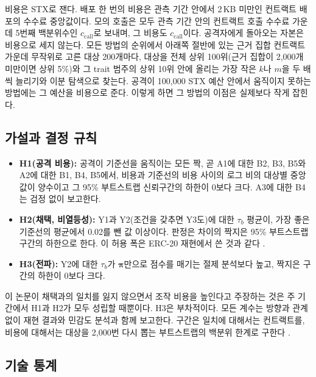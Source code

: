 비용은 STX로 잰다. 배포 한 번의 비용은 관측 기간 안에서 2\,KB 미만인 컨트랙트 배포의 수수료 중앙값이다. 모의 호출은 모두 관측 기간 안의 컨트랙트 호출 수수료 가운데 5번째 백분위수인 $c_{\mathrm{call}}$로 보내며, 그 비용도 $c_{\mathrm{call}}$이다. 공격자에게 돌아오는 자본은 비용으로 세지 않는다. 모든 방법의 순위에서 아래쪽 절반에 있는 근거 집합 컨트랙트 가운데 무작위로 고른 대상 200개마다, 대상을 전체 상위 100위(근거 집합이 2,000개 미만이면 상위 5\%)와 그 trait 범주의 상위 10위 안에 올리는 가장 작은 $k$나 $m$을 두 배씩 늘리기와 이분 탐색으로 찾는다. 공격이 100,000 STX 예산 안에서 움직이지 못하는 방법에는 그 예산을 비용으로 준다. 이렇게 하면 그 방법의 이점은 실제보다 작게 잡힌다.

\subsection{가설과 결정 규칙}

\begin{itemize}
\item \textbf{H1(공격 비용):} 공격이 기준선을 움직이는 모든 짝, 곧 A1에 대한 B2, B3, B5와 A2에 대한 B1, B4, B5에서,  비용과 기준선의 비용 사이의 로그 비의 대상별 중앙값이 양수이고 그 95\% 부트스트랩 신뢰구간의 하한이 0보다 크다. A3에 대한 B4는 검정 없이 보고한다.
\item \textbf{H2(채택, 비열등성):}  Y1과 Y2(조건을 갖추면 Y3도)에 대한 $\tau_b$ 평균이, 가장 좋은 기준선의 평균에서 0.02를 뺀 값 이상이다. 판정은 차이의 짝지은 95\% 부트스트랩 구간의 하한으로 한다. 이 허용 폭은 ERC-20 재현에서 쓴 것과 같다 \cite{kwon2026endorserank}.
\item \textbf{H3(전파):} Y2에 대한 $\tau_b$가  $\boldsymbol{\pi}$만으로 점수를 매기는 절제 분석보다 높고, 짝지은 구간의 하한이 0보다 크다.
\end{itemize}

이 논문이  채택과의 일치를 잃지 않으면서 조작 비용을 높인다고 주장하는 것은 주 기간에서 H1과 H2가 모두 성립할 때뿐이다. H3은 부차적이다. 모든 계수는 방향과 관계없이 재현 결과와 민감도 분석과 함께 보고한다. 구간은 일치에 대해서는 컨트랙트를, 비용에 대해서는 대상을 2,000번 다시 뽑는 부트스트랩의 백분위 한계로 구한다 \cite{efron1979}.

\subsection{기술 통계}

